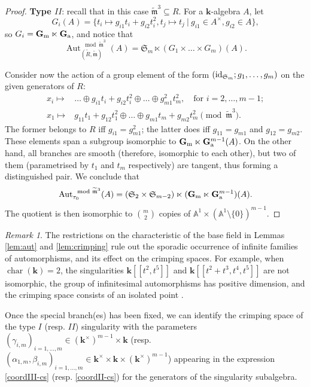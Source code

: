 \documentclass{compositio}
\renewcommand{\k}{\mathbf k}
\newcommand{\tR}{\widetilde{R}}
\newcommand{\tm}{\widetilde{\mathfrak m}}
\newcommand{\Aaff}{\mathbb A}
\newcommand{\Gm}{\mathbb{G}_{\rm{m}}}
\newcommand{\Ga}{\mathbb{G}_{\rm{a}}}
\newcommand{\Aut}{\operatorname{Aut}}
\newcommand{\id}{{\rm id}}
\theoremstyle{plain}
\theoremstyle{definition}
\theoremstyle{remark}
\newtheorem{rem}[thm]{Remark}
\begin{document}
\begin{proof}
\textbf{Type $I\!I$}: recall that in this case $\tm^3\subseteq R$. For a $\k$-algebra $A$, let
\[G_i(A)=\{t_i\mapsto g_{i1}t_i+g_{i2}t_i^2,t_j\mapsto t_j\ |\ g_{i1}\in A^\times,g_{i2}\in A\},\]
 so $G_i= \Gm\ltimes\Ga$, and notice that
\[\Aut_{(\tR,\tm)}^{\mod\tm^3}(A)= \mathfrak{S}_m\ltimes(G_1\times\ldots\times G_m)(A).\]

Consider now the action of a group element of the form $(\id_{\mathfrak{S}_m};g_1,\ldots,g_m)$ on the given generators of $R$:
\begin{align*}
 x_i\mapsto& \ldots\oplus g_{i1}t_i+g_{i2}t_i^2\oplus\ldots\oplus g_{m1}^2t_m^2,\quad\text{for } i=2,\ldots,m-1;\\
 x_1\mapsto& g_{11}t_1+g_{12}t_1^2\oplus\ldots\oplus g_{m1}t_m+g_{m2}t_m^2 \pmod{\tm^3}.
\end{align*}
The former belongs to $R$ iff $g_{i1}=g_{m1}^2$; the latter does iff $g_{11}=g_{m1}$ and $g_{12}=g_{m2}$. These elements span a subgroup isomorphic to $\Gm\ltimes\Ga^{m-1}(A)$. On the other hand, all branches are smooth (therefore, isomorphic to each other), but two of them (parametrised by $t_1$ and $t_m$ respectively) are tangent, thus forming a distinguished pair. We conclude that
\[\Aut_{\tau_0}^{\mod\tm^3}(A)=(\mathfrak{S}_2\times\mathfrak{S}_{m-2})\ltimes(\Gm\ltimes\Ga^{m-1})(A).\]
The quotient is then isomorphic to $\binom{m}{2}$ copies of $\Aaff^1\times(\Aaff^1\setminus\{0\})^{m-1}$.
\end{proof}


\begin{rem}\label{rem:characteristic}
 The restrictions on the characteristic of the base field in Lemmas \ref{lem:aut} and \ref{lem:crimping} rule out the sporadic occurrence of infinite families of automorphisms, and its effect on the crimping spaces. For example, when $\operatorname{char}(\k)=2$, the singularities $\k[\![t^2,t^5]\!]$ and $\k[\![t^2+t^3,t^4,t^5]\!]$ are not isomorphic, the group of infinitesimal automorphisms has positive dimension, and the crimping space consists of an isolated point \cite[Examples 1.79-80]{vdW}.
\end{rem}

Once the special branch(es) has been fixed, we can identify the crimping space of the type $I$ (resp. $I\!I$) singularity with the parameters $(\gamma_{i,m})_{i=1,\ldots,m}\in(\k^\times)^{m-1}\times\k$ (resp. $(\alpha_{1,m},\beta_{i,m})_{i=1,\ldots,m}\in \k^\times\times\k\times(\k^\times)^{m-1}$) appearing in the expression \eqref{coordIII-cs} (resp. \eqref{coordII-cs}) for the generators of the singularity subalgebra.
\end{document}
